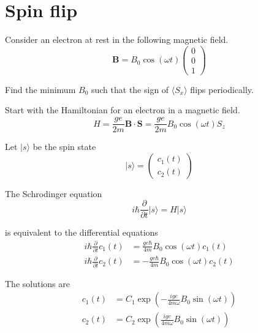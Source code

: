 

\section*{Spin flip}

Consider an electron at rest in the following magnetic field.
\begin{equation*}
\mathbf B=B_0\cos(\omega t)\begin{pmatrix}0\\0\\1\end{pmatrix}
\end{equation*}

Find the minimum $B_0$ such that the sign of $\langle S_x\rangle$
flips periodically.

\bigskip
Start with the Hamiltonian for an electron in a magnetic field.
\begin{equation*}
H=\frac{ge}{2m}\mathbf B\cdot\mathbf S
=\frac{ge}{2m}B_0\cos(\omega t)S_z
\end{equation*}

Let $|s\rangle$ be the spin state
\begin{equation*}
|s\rangle=\begin{pmatrix}c_1(t)\\c_2(t)\end{pmatrix}
\end{equation*}

The Schrodinger equation
\begin{equation*}
i\hbar\frac{\partial}{\partial t}|s\rangle=H|s\rangle
\end{equation*}

is equivalent to the differential equations
\begin{align*}
i\hbar\frac{\partial}{\partial t}c_1(t)&=\frac{ge\hbar}{4m}B_0\cos(\omega t)c_1(t)
\\
i\hbar\frac{\partial}{\partial t}c_2(t)&=-\frac{ge\hbar}{4m}B_0\cos(\omega t)c_2(t)
\end{align*}

The solutions are
\begin{equation*}
\begin{aligned}
c_1(t)&=C_1\exp\left(-\frac{ige}{4m\omega}B_0\sin(\omega t)\right)
\\
c_2(t)&=C_2\exp\left(\frac{ige}{4m\omega}B_0\sin(\omega t)\right)
\end{aligned}
\tag{1}
\end{equation*}

